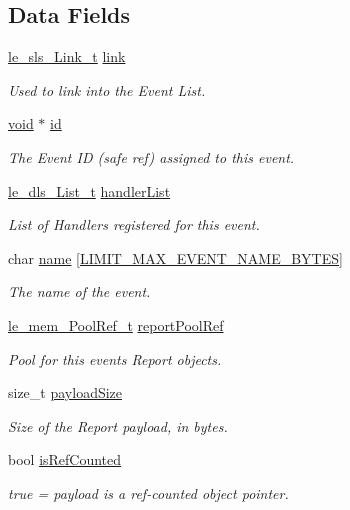 \subsection*{Data Fields}
\begin{DoxyCompactItemize}
\item 
\hyperlink{structle__sls___link__t}{le\+\_\+sls\+\_\+\+Link\+\_\+t} \hyperlink{struct_event__t_a71c82639758c9b263ffd9a6838f16240}{link}
\begin{DoxyCompactList}\small\item\em Used to link into the Event List. \end{DoxyCompactList}\item 
\hyperlink{_t_e_m_p_l_a_t_e__cdef_8h_ac9c84fa68bbad002983e35ce3663c686}{void} $\ast$ \hyperlink{struct_event__t_af30e228e32fa2b5dceeae641dcc02a16}{id}
\begin{DoxyCompactList}\small\item\em The Event ID (safe ref) assigned to this event. \end{DoxyCompactList}\item 
\hyperlink{structle__dls___list__t}{le\+\_\+dls\+\_\+\+List\+\_\+t} \hyperlink{struct_event__t_a01b2af5e04200a2eefb73ac00287163b}{handler\+List}
\begin{DoxyCompactList}\small\item\em List of Handlers registered for this event. \end{DoxyCompactList}\item 
char \hyperlink{struct_event__t_a39459865b6f387597cc189420ba47f4f}{name} \mbox{[}\hyperlink{limit_8h_ae7b5be5d596b6a314e63fb34c7edfb05}{L\+I\+M\+I\+T\+\_\+\+M\+A\+X\+\_\+\+E\+V\+E\+N\+T\+\_\+\+N\+A\+M\+E\+\_\+\+B\+Y\+T\+ES}\mbox{]}
\begin{DoxyCompactList}\small\item\em The name of the event. \end{DoxyCompactList}\item 
\hyperlink{le__mem_8h_a44a896f6a0a1a8c733e8038eb332989e}{le\+\_\+mem\+\_\+\+Pool\+Ref\+\_\+t} \hyperlink{struct_event__t_a40bab5d184f25b39691053b445966c16}{report\+Pool\+Ref}
\begin{DoxyCompactList}\small\item\em Pool for this event\textquotesingle{}s Report objects. \end{DoxyCompactList}\item 
size\+\_\+t \hyperlink{struct_event__t_ac9e4c1fed8cd5750033933274b27124d}{payload\+Size}
\begin{DoxyCompactList}\small\item\em Size of the Report payload, in bytes. \end{DoxyCompactList}\item 
bool \hyperlink{struct_event__t_a029e6394a86ac5455f349a5b8de372e3}{is\+Ref\+Counted}
\begin{DoxyCompactList}\small\item\em true = payload is a ref-\/counted object pointer. \end{DoxyCompactList}\end{DoxyCompactItemize}


